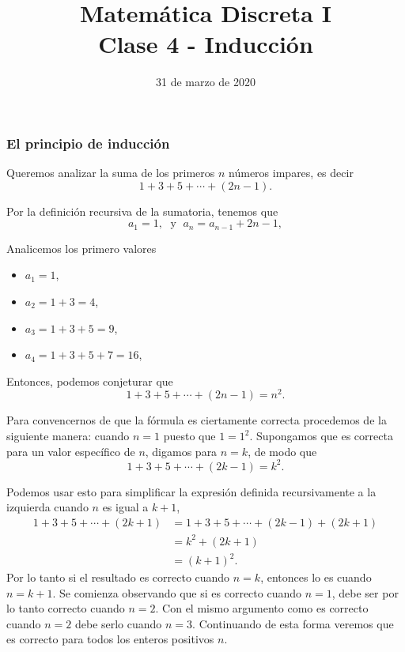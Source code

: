\documentclass{beamer}
\title[Clase 4 - Inducción]{Matemática Discreta I \\ Clase 4 - Inducción}
\institute[]{\normalsize FAMAF / UNC
	\\[\baselineskip] ${}^{}$
	\\[\baselineskip]
}
\date[02/04/2020]{31 de marzo   de 2020}
\begin{document}



\frame{\titlepage} 





\begin{frame}\frametitle{El principio de inducción} 

	Queremos  analizar la suma de los primeros $n$ números impares, es decir
	$$
	1+3+5+\cdots+(2n-1).
	$$
	
	Por la definición recursiva de la sumatoria,  tenemos que 
	\begin{equation*}
	a_1 = 1, \;\text{  y } \; a_n = a_{n-1} + 2n-1,
	\end{equation*}
	
	
	Analicemos los primero valores
	
	\begin{itemize}
		\item $a_1 = 1$,
		\item $a_2 = 1 + 3 = 4$, 
		\item $a_3 = 1 + 3 + 5 = 9$, 
		\item $a_4 = 1 + 3 + 5 + 7= 16 $, 
	\end{itemize}
	
\end{frame}


\begin{frame}	
	Entonces, podemos conjeturar que
	$$
	1+3+5+\cdots+(2n-1) = n^2.
	$$
	
	Para convencernos de que la fórmula es ciertamente correcta procedemos de la siguiente manera: cuando $n=1$ puesto que
	$1=1^2$.
	Supongamos que es correcta para un valor específico
	de $n$, digamos para $n=k$, de modo que
	$$
	1+3+5+\cdots+(2k-1) = k^2.
	$$



\end{frame}

\begin{frame}
		Podemos usar esto para simplificar la expresión definida
	recursivamente a la izquierda cuando $n$ es igual a $k+1$,
	$$
	\begin{aligned}
	1+3+5+\cdots+(2k+1) &= 1+3+5+\cdots+(2k-1) +(2k+1) \\
	&=k^2 +(2k+1) \\
	&=(k+1)^2.
	\end{aligned}
	$$
	Por lo tanto si el resultado es correcto cuando $n=k$, entonces lo es cuando $n=k+1$. Se comienza observando que si es correcto cuando $n=1$, debe ser por lo tanto correcto cuando $n=2$. Con el mismo argumento como es correcto cuando $n=2$ debe serlo cuando $n=3$. Continuando de esta forma veremos que es correcto para todos los enteros positivos $n$.
\end{frame}
\end{document}
